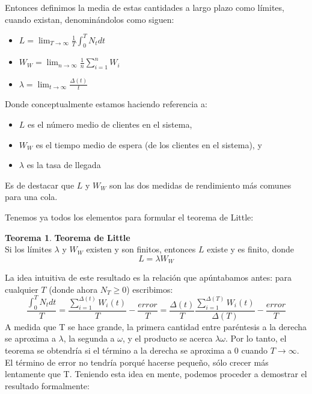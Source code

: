 \documentclass[a4paper,10pt]{scrartcl}
\theoremstyle{definition}
\newtheorem*{theorem*}{Teorema}
\theoremstyle{definition}
\newtheorem*{theorem*}{Teorema}
\numberwithin{equation}{section}
\begin{document}
	Entonces definimos la media de estas cantidades a largo plazo como límites, cuando existan, denominándolos
	como siguen:
	
	\begin{itemize}
		\item $L = \lim_{T\to \infty}\frac{1}{T} \int_{0}^{T} N_t dt$
		\item $W_W = \lim_{n\to \infty}\frac{1}{n} \sum_{i=1}^{n} W_i$
		\item $\lambda = \lim_{t\to \infty}\frac{\Delta(t)}{t}$
	\end{itemize}
	
	Donde conceptualmente estamos haciendo referencia a:
	\begin{itemize}
		\item $L$ es el número medio de clientes en el sistema,
		\item $W_W$ es el tiempo medio de espera (de los clientes en el sistema), y
		\item $\lambda$ es la tasa de llegada 
	\end{itemize}
	Es de destacar que  $L$ y $W_W$ son las dos medidas de rendimiento más comunes para una cola.
	
	
	Tenemos ya todos los elementos para formular el teorema de Little:
	\begin{theorem*}{\textbf{Teorema de Little}}\\
		Si los límites $\lambda$ y $W_W$ existen y son finitos, entonces $L$ existe y es finito, donde 
		\[L = \lambda W_W\]
	\end{theorem*}
	
	La idea intuitiva de este resultado es la relación que apúntabamos antes: para cualquier $T$ (donde ahora $N_T \geq 0$) escribimos:
	\[ \frac{\int_{0}^{T} N_t dt}{T}=\frac{\sum_{i=1}^{\Delta (t)} W_i(t)}{T}-\frac{error}{T}=\frac{\Delta(t)}{T}\frac{\sum_{i=1}^{\Delta (T)} W_i(t)}{\Delta(T)}-\frac{error}{T}   \]
	A medida que T se hace grande, la primera cantidad entre paréntesis a la derecha se aproxima a $\lambda$, la segunda a $\omega$, 
	y el producto se acerca $\lambda\omega$. Por lo tanto, el teorema se obtendría si el término a la derecha 
	se aproxima a 0 cuando $T\rightarrow\infty$. El término de error no tendría porqué hacerse pequeño, 
	sólo crecer más lentamente que T.
	Teniendo esta idea en mente, podemos proceder a demostrar el resultado formalmente:
	
\end{document}
